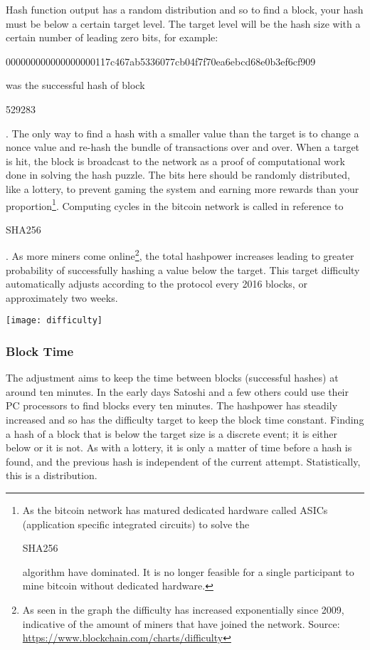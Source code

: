  Hash function output has a random distribution and so to find a block, your hash must be below a certain target level. The target level will be the hash size with a certain number of leading zero bits, for example:\begin{center}\begin{code}
	000000000000000000117c467ab5336077cb04f7f70ea6ebcd68e0b3ef6cf909
\end{code}\end{center} 
was the successful hash of block \begin{code}529283\end{code}. The only way to find a hash with a smaller value than the target is to change a nonce value and re-hash the bundle of transactions over and over. When a target is hit, the block is broadcast to the network as a proof of computational work done in solving the hash puzzle. 
The bits here should be randomly distributed, like a lottery, to prevent gaming the system and earning more rewards than your proportion\footnote{As the bitcoin network has matured dedicated hardware called ASICs (application specific integrated circuits) to solve the \begin{code}SHA256\end{code} algorithm have dominated. It is no longer feasible for a single participant to mine bitcoin without dedicated hardware.}. Computing cycles in the bitcoin network is called  in reference to \begin{code}SHA256\end{code}. As more miners come online\footnote{As seen in the graph the difficulty has increased exponentially since 2009, indicative of the amount of miners that have joined the network. Source: \url{https://www.blockchain.com/charts/difficulty}}, the total hashpower increases leading to greater probability of successfully hashing a value below the target. This target difficulty automatically adjusts according to the protocol every 2016 blocks, or approximately two weeks.

\begin{center}
	\texttt{[image: difficulty]}
\end{center}


\subsubsection*{Block Time}
The adjustment aims to keep the time between blocks (successful hashes) at around ten minutes. In the early days Satoshi and a few others could use their PC processors to find blocks every ten minutes. The hashpower has steadily increased and so has the difficulty target to keep the block time constant. Finding a hash of a block that is below the target size is a discrete event; it is either below or it is not. As with a lottery, it is only a matter of time before a hash is found, and the previous hash is independent of the current attempt. Statistically, this is a  distribution. %


